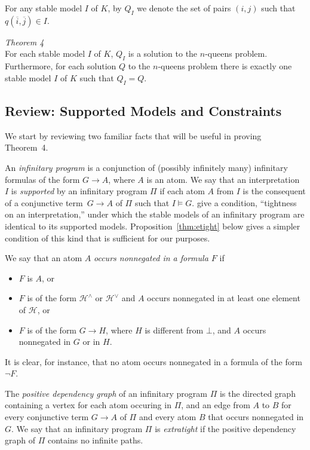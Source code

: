 \documentclass{tlp}
\def\o{\overline}
\def\rar{\rightarrow}
\begin{document}
For any stable model $I$ of $K$, by $Q_I$ we denote the set of
pairs $(i, j)$ such that $q(\o i, \o j) \in I$.

\medskip

\noindent\emph{Theorem 4}\\
For each stable model $I$ of $K$, $Q_I$ is a
solution to the $n$-queens problem.  Furthermore, for each solution $Q$ to
the $n$-queens problem there is exactly one stable model $I$ of $K$ such that
$Q_I = Q$.

\medskip

\subsection*{Review: Supported Models and Constraints}

We start by reviewing two familiar facts that will be
useful in proving Theorem~4.

An {\sl infinitary program} is a conjunction of (possibly infinitely
many) infinitary formulas of the form $G \rar A$, where $A$ is an atom.
We say that an interpretation $I$ is
{\sl supported} by an infinitary program $\Pi$ if each atom $A$ from $I$ is
the consequent of a conjunctive term~$G\rar A$ of $\Pi$ such that $I\models G$.
 \citeyear{lif13a} give a condition, ``tightness on an
interpretation,''  under which the stable models of
an infinitary program are identical to its supported models.
Proposition~\ref{thm:etight} below
gives a simpler condition of this kind that is sufficient for our purposes.

We say that an atom $A$ {\sl occurs nonnegated in a formula $F$} if
\begin{itemize}
\item $F$ is $A$, or
\item $F$ is of the form $\mathcal{H}^\land$ or $\mathcal{H}^\lor$ and $A$ occurs nonnegated in at least one element of $\mathcal{H}$, or
\item $F$ is of the form $G \rar H$, where $H$ is different from $\bot$, and
$A$ occurs nonnegated in $G$ or in $H$.
\end{itemize}
It is clear, for instance, that no atom occurs nonnegated in a formula of the
form $\neg F$.

The {\sl positive dependency graph} of an infinitary program $\Pi$ is the
directed graph containing a vertex for each atom occuring in $\Pi$, and an
edge from $A$ to $B$ for every conjunctive term $G \rar A$ of $\Pi$ and every
atom $B$ that occurs nonnegated in $G$.
We say that an infinitary program $\Pi$ is {\sl extratight}
if the positive dependency graph of $\Pi$ contains no infinite paths.
\end{document}
